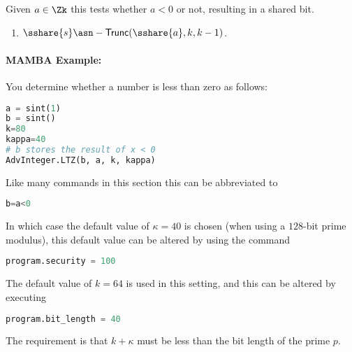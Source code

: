   \iffalse
    \note{Nigel}{Does not seem to be used anywhere}
    \msubsubsection{$\mathsf{Mod}(\sshare{a},k,x)$:}
    Given $a \in \Zk$ and public $x \in [1,\ldots,2^{k-1}-1]$
    this computes $\sshare{a \pmod{x}}$.
    \begin{enumerate}
      \item $m \asn \ceil{\log_2 x }$.
      \item $\sshare{r'}, \sshare{r}, \sshare{r}_B \asn \mathsf{PRandM}(k,m,\kappa)$.
      \item $c \asn \Open(\sshare{a}+2^{k-1}+\sshare{r}+x \cdot \sshare{r'})$.
      \item $c' \asn c \pmod{x}$.
      \item $\sshare{v} \asn 1 -\mathsf{BitLT}(\sshare{r}_B,x)$.
      \item $\sshare{u} \asn \mathsf{LTZ}(c' - \sshare{r} + x \cdot \sshare{v},m)$.
      \item $\sshare{a'} \asn c' - \sshare{r} + x \cdot ( \sshare{v}+\sshare{u})$.
      \item Return $\sshare{a'}$.
    \end{enumerate}
  \fi

  Given $a \in \Zk$ this tests whether $a<0$ or not,
  resulting in a shared bit.
  \begin{enumerate}
    \item $\sshare{s} \asn - \mathsf{Trunc}(\sshare{a},k,k-1)$.
  \end{enumerate}

  \paragraph{MAMBA Example:} You determine whether a number is less than zero as follows:
  \begin{lstlisting}[language={python}]
a = sint(1)
b = sint()
k=80
kappa=40
# b stores the result of x < 0
AdvInteger.LTZ(b, a, k, kappa)
\end{lstlisting}
  Like many commands in this section this can be abbreviated to
  \begin{lstlisting}[language={python}]
b=a<0
\end{lstlisting}
  In which case the default value of $\kappa=40$ is chosen
  (when using a $128$-bit prime modulus), this default value can be
  altered by using the command
  \begin{lstlisting}[language={python}]
program.security = 100
\end{lstlisting}
  The default value of $k=64$ is used in this setting, and
  this can be altered by executing
  \begin{lstlisting}[language={python}]
program.bit_length = 40
\end{lstlisting}
  The requirement is that $k+\kappa$ must be less than the bit length
  of the prime $p$.


